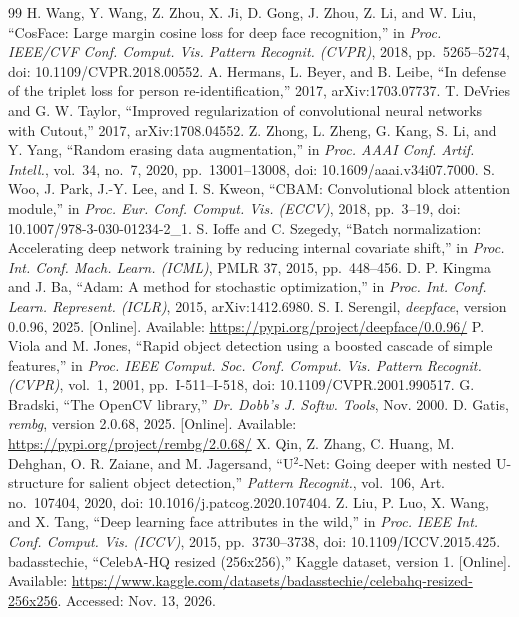 \begin{thebibliography}{99}
 H. Wang, Y. Wang, Z. Zhou, X. Ji, D. Gong, J. Zhou, Z. Li, and W. Liu, ``CosFace: Large margin cosine loss for deep face recognition,'' in \textit{Proc. IEEE/CVF Conf. Comput. Vis. Pattern Recognit. (CVPR)}, 2018, pp.~5265--5274, doi: 10.1109/CVPR.2018.00552.
 A. Hermans, L. Beyer, and B. Leibe, ``In defense of the triplet loss for person re-identification,'' 2017, arXiv:1703.07737.
 T. DeVries and G. W. Taylor, ``Improved regularization of convolutional neural networks with Cutout,'' 2017, arXiv:1708.04552.
 Z. Zhong, L. Zheng, G. Kang, S. Li, and Y. Yang, ``Random erasing data augmentation,'' in \textit{Proc. AAAI Conf. Artif. Intell.}, vol.~34, no.~7, 2020, pp.~13001--13008, doi: 10.1609/aaai.v34i07.7000.
 S. Woo, J. Park, J.-Y. Lee, and I. S. Kweon, ``CBAM: Convolutional block attention module,'' in \textit{Proc. Eur. Conf. Comput. Vis. (ECCV)}, 2018, pp.~3--19, doi: 10.1007/978-3-030-01234-2\_1.
 S. Ioffe and C. Szegedy, ``Batch normalization: Accelerating deep network training by reducing internal covariate shift,'' in \textit{Proc. Int. Conf. Mach. Learn. (ICML)}, PMLR 37, 2015, pp.~448--456.
 D. P. Kingma and J. Ba, ``Adam: A method for stochastic optimization,'' in \textit{Proc. Int. Conf. Learn. Represent. (ICLR)}, 2015, arXiv:1412.6980.
 S. I. Serengil, \textit{deepface}, version 0.0.96, 2025. [Online]. Available: \url{https://pypi.org/project/deepface/0.0.96/}
 P. Viola and M. Jones, ``Rapid object detection using a boosted cascade of simple features,'' in \textit{Proc. IEEE Comput. Soc. Conf. Comput. Vis. Pattern Recognit. (CVPR)}, vol.~1, 2001, pp.~I-511--I-518, doi: 10.1109/CVPR.2001.990517.
 G. Bradski, ``The OpenCV library,'' \textit{Dr. Dobb's J. Softw. Tools}, Nov. 2000.
 D. Gatis, \textit{rembg}, version 2.0.68, 2025. [Online]. Available: \url{https://pypi.org/project/rembg/2.0.68/}
 X. Qin, Z. Zhang, C. Huang, M. Dehghan, O. R. Zaiane, and M. Jagersand, ``U$^2$-Net: Going deeper with nested U-structure for salient object detection,'' \textit{Pattern Recognit.}, vol.~106, Art. no.~107404, 2020, doi: 10.1016/j.patcog.2020.107404.
 Z. Liu, P. Luo, X. Wang, and X. Tang, ``Deep learning face attributes in the wild,'' in \textit{Proc. IEEE Int. Conf. Comput. Vis. (ICCV)}, 2015, pp.~3730--3738, doi: 10.1109/ICCV.2015.425.
 badasstechie, ``CelebA-HQ resized (256x256),'' Kaggle dataset, version 1. [Online]. Available: \url{https://www.kaggle.com/datasets/badasstechie/celebahq-resized-256x256}. Accessed: Nov. 13, 2026.

\end{thebibliography}
